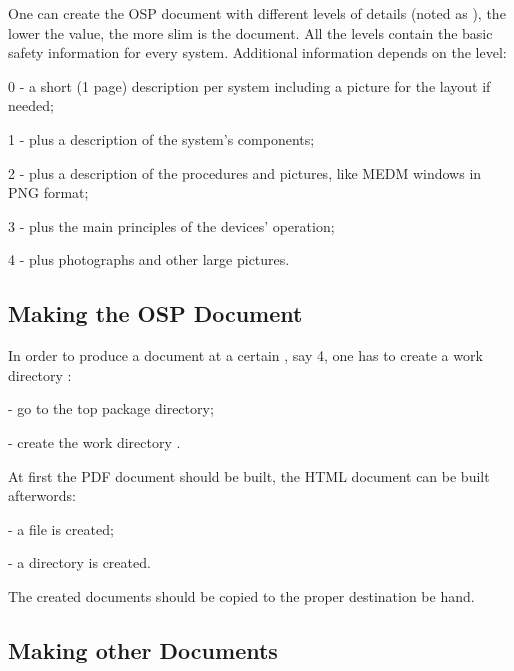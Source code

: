 \documentclass[12pt,letterpaper]{article}
\newcommand{\myil}[0]{{\color{red}{\em infolevel}}}
\begin{document}
  One can create the OSP document with different levels of
  details (noted as \myil{}), the lower the value, 
  the more slim is the document. All the levels contain the 
  basic safety information for every system. Additional 
  information depends on the level:
  \begin{list}{}{\setlength{\itemsep}{-0.15cm}}
    \item[{\color{red}0}] - a short (1 page) description per system including 
            a picture for the layout if needed;
    \item[{\color{red}1}] - plus a description of the system's components;
    \item[{\color{red}2}] - plus a description of the procedures and pictures, 
               like MEDM windows in PNG format;
    \item[{\color{red}3}] - plus the main principles of the devices' 
               operation;
    \item[{\color{red}4}] - plus photographs and other large pictures.
  \end{list} 


\subsection{Making the OSP Document}
\label{sec:make}

  In order to produce a document%
   at a certain \myil{}, say {\color{red}4},
  one has to create a work directory :
  \begin{list}{}{\setlength{\itemsep}{-0.15cm}}
    \item {} - go to the top package directory;
    \item {} - create the work directory .
  \end{list}

  At first the PDF document should be built, the HTML document 
  can be built afterwords:
  \begin{list}{}{\setlength{\itemsep}{-0.15cm}}
    \item {} 
    \item {} - a file  is created;
    \item {} - a directory  is created.
  \end{list}
  The created documents should be copied to the proper
  destination be hand.

\subsection{Making other Documents}
\label{sec:makeother}
\end{document}
